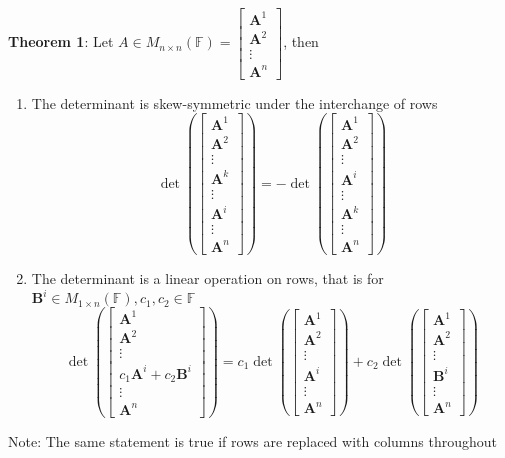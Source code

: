 \documentclass[11pt,notitlepage]{report}
\newcommand{\bb}[1]{\ensuremath{\mathbb{#1}}}
\newcommand{\tbf}[1]{\textbf{#1}}
\begin{document}
\textbf{Theorem 1}: Let $A \in M_{n \times n}(\bb F) = \begin{bmatrix}\tbf A^1 \\ \tbf A^2\\ \vdots\\ \tbf A^n\end{bmatrix}$, then
\begin{enumerate}[label=\alph*)]
    \item The determinant is skew-symmetric under the interchange of rows
    $$\det\left(\begin{bmatrix}\tbf A^1 \\ \tbf A^2\\ \vdots\\ \tbf A^k\\ \vdots\\ \tbf A^i\\ \vdots\\ \tbf A^n\end{bmatrix}\right) = -\det\left(\begin{bmatrix}\tbf A^1 \\ \tbf A^2\\ \vdots\\ \tbf A^i\\ \vdots\\ \tbf A^k\\ \vdots\\ \tbf A^n\end{bmatrix}\right)$$
    \item The determinant is a linear operation on rows, that is for $\tbf B^i \in M_{1 \times n}(\bb F), c_1, c_2 \in \bb F$
    $$\det\left(\begin{bmatrix}\tbf A^1 \\ \tbf A^2\\ \vdots\\ c_1\tbf A^i + c_2\tbf B^i\\ \vdots\\ \tbf A^n\end{bmatrix}\right) = c_1\det\left(\begin{bmatrix}\tbf A^1 \\ \tbf A^2\\ \vdots\\ \tbf A^i\\ \vdots\\ \tbf A^n\end{bmatrix}\right) + c_2\det\left(\begin{bmatrix}\tbf A^1 \\ \tbf A^2\\ \vdots\\ \tbf B^i\\ \vdots\\ \tbf A^n\end{bmatrix}\right)$$
\end{enumerate}
\hspace*{5mm} Note: The same statement is true if rows are replaced with columns throughout
\end{document}
